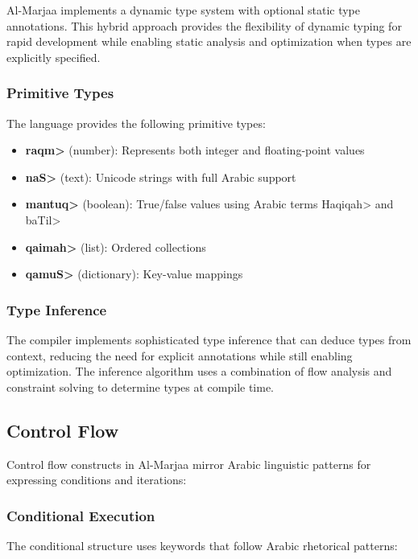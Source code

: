 \documentclass[11pt,a4paper]{article}
\begin{document}
Al-Marjaa implements a dynamic type system with optional static type annotations. This hybrid approach provides the flexibility of dynamic typing for rapid development while enabling static analysis and optimization when types are explicitly specified.

\subsubsection{Primitive Types}

The language provides the following primitive types:

\begin{itemize}
    \item \textbf{\<raqm>} (number): Represents both integer and floating-point values
    \item \textbf{\<naS>} (text): Unicode strings with full Arabic support
    \item \textbf{\<mantuq>} (boolean): True/false values using Arabic terms \<Haqiqah> and \<baTil>
    \item \textbf{\<qaimah>} (list): Ordered collections
    \item \textbf{\<qamuS>} (dictionary): Key-value mappings
\end{itemize}

\subsubsection{Type Inference}

The compiler implements sophisticated type inference that can deduce types from context, reducing the need for explicit annotations while still enabling optimization. The inference algorithm uses a combination of flow analysis and constraint solving to determine types at compile time.

\subsection{Control Flow}

Control flow constructs in Al-Marjaa mirror Arabic linguistic patterns for expressing conditions and iterations:

\subsubsection{Conditional Execution}

The conditional structure uses keywords that follow Arabic rhetorical patterns:
\end{document}
